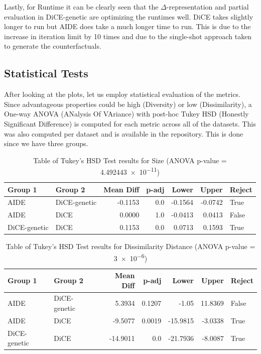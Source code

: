 Lastly, for Runtime it can be clearly seen that the $\Delta$-representation and partial evaluation in DiCE-genetic are optimizing the runtimes well. DiCE takes slightly longer to run but AIDE does take a much longer time to run. This is due to the increase in iteration limit by 10 times and due to the single-shot approach taken to generate the counterfactuals. 

\subsection{Statistical Tests}
After looking at the plots, let us employ statistical evaluation of the metrics. Since advantageous properties could be high (Diversity) or low (Dissimilarity), a One-way ANOVA (ANalysis Of VAriance) with post-hoc Tukey HSD (Honestly Significant Difference) is computed for each metric across all of the datasets. This was also computed per dataset and is available in the repository. This is done since we have three groups.

\begin{table}[!htbp]
    \centering
    \centering
    \begin{tabular}{l l r r r r l}
        \toprule
        Group 1 & Group 2 & Mean Diff & p-adj & Lower & Upper & Reject \\
        \midrule
        AIDE & DiCE-genetic   & -0.1153 & 0.0 & -0.1564 & -0.0742 & True \\
        AIDE & DiCE  &  0.0000 & 1.0 & -0.0413 &  0.0413 & False \\
        DiCE-genetic & DiCE  &  0.1153 & 0.0 &  0.0713 &  0.1593 & True \\
        \bottomrule
    \end{tabular}
    \caption{Table of Tukey's HSD Test results for Size (ANOVA p-value = \SI{4.492443e-11}{})}
    \label{tab:tukey-results-size}
\end{table}

\begin{table}[!htbp]
    \centering
    \begin{tabular}{llrrrrl}
        \toprule
        Group 1 & Group 2 & Mean Diff & p-adj & Lower & Upper & Reject \\
        \midrule
        AIDE          & DiCE-genetic   &  5.3934  & 0.1207 &  -1.05   & 11.8369  & False \\
        AIDE          & DiCE  & -9.5077  & 0.0019 & -15.9815 &  -3.0338 & True  \\
        DiCE-genetic & DiCE  & -14.9011 & 0.0    & -21.7936 &  -8.0087 & True  \\
        \bottomrule
    \end{tabular}
    \caption{Table of Tukey's HSD Test results for Dissimilarity Distance (ANOVA p-value = \SI{3e-6}{})}
    \label{tab:tukey-results-dis-dist}
\end{table}

